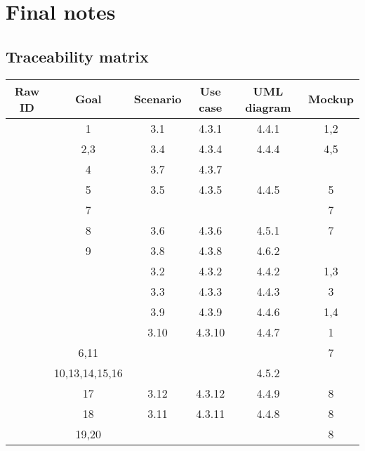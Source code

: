 \pagebreak
\section{Final notes}

\subsection{Traceability matrix}


\newcommand{\Row}[5]{
	\stepcounter{RowID}
	\arabic{RowID} & #1 & #2 & #3 & #4 & #5 \\

}

\begin{center}
	\begin{tabular}{|c c c c c c|}
			\hline
			\textbf{Raw ID}	& \textbf{Goal}	& \textbf{Scenario}	& \textbf{Use case}	& \textbf{UML diagram} & \textbf{Mockup}	\\
			\hline
			\Row{1}{3.1}{4.3.1}{4.4.1}{1,2}
			\hline
			\Row{2,3}{3.4}{4.3.4}{4.4.4}{4,5}
			\hline
			\Row{4}{3.7}{4.3.7}{}{}
			\hline
			\Row{5}{3.5}{4.3.5}{4.4.5}{5}
			\hline
			\Row{7}{}{}{}{7}
			\hline
			\Row{8}{3.6}{4.3.6}{4.5.1}{7}
			\hline
			\Row{9}{3.8}{4.3.8}{4.6.2}{}
			\hline
			\Row{}{3.2}{4.3.2}{4.4.2}{1,3}
			\hline
			\Row{}{3.3}{4.3.3}{4.4.3}{3}
			\hline
			\Row{}{3.9}{4.3.9}{4.4.6}{1,4}
			\hline
			\Row{}{3.10}{4.3.10}{4.4.7}{1}
			\hline
			\Row{6,11}{}{}{}{7}
			\hline
			\Row{10,13,14,15,16}{}{}{4.5.2}{}
			\hline
			\Row{17}{3.12}{4.3.12}{4.4.9}{8}
			\hline
			\Row{18}{3.11}{4.3.11}{4.4.8}{8}
			\hline
			\Row{19,20}{}{}{}{8}
	
			\hline
	\end{tabular}
\end{center}
